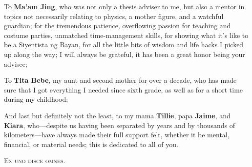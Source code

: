 To \textbf{Ma'am Jing}, who was not only a thesis adviser to me, but also a mentor in topics not necessarily relating to physics, a mother figure, and a watchful guardian; for the tremendous patience, overflowing passion for teaching and costume parties, unmatched time-management skills, for showing what it's like to be a Siyentista ng Bayan, for all the little bits of wisdom and life hacks I picked up along the way; I will always be grateful, it has been a great honor being your advisee;

To \textbf{Tita Bebe}, my aunt and second mother for over a decade, who has made sure that I got everything I needed since sixth grade, as well as for a short time during my childhood;

And last but definitely not the least, to my mama \textbf{Tillie}, papa \textbf{Jaime}, and \textbf{Kiara}, who---despite us having been separated by years and by thousands of kilometers---have always made their full support felt, whether it be mental, financial, or material needs; this is dedicated to all of you.

\vfill

\begin{center}
	\textsc{Ex uno disce omnes.}
\end{center}